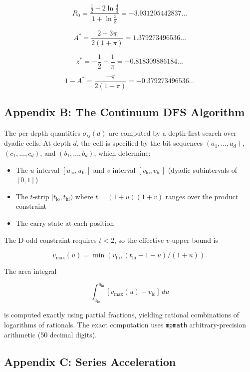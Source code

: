 \documentclass[
  11pt,
]{article}
\providecommand{\tightlist}{%
  \setlength{\itemsep}{0pt}\setlength{\parskip}{0pt}}
\begin{document}
\[R_0 = \frac{\tfrac{1}{2} - 2\ln\tfrac{4}{3}}{1 + \ln\tfrac{3}{8}} = -3.931205442837\ldots\]

\[A^{\ast} = \frac{2 + 3\pi}{2(1+\pi)} = 1.379273496536\ldots\]

\[z^{\ast} = -\frac{1}{2} - \frac{1}{\pi} = -0.818309886184\ldots\]

\[1 - A^{\ast} = \frac{-\pi}{2(1+\pi)} = -0.379273496536\ldots\]

\newpage

\subsection{Appendix B: The Continuum DFS
Algorithm}\label{appendix-b-the-continuum-dfs-algorithm}

The per-depth quantities \(\sigma_{ij}(d)\) are computed by a depth-first search
over dyadic cells. At depth \(d\), the cell is specified by the bit sequences
\((a_1, \ldots, a_d)\), \((c_1, \ldots, c_d)\), and \((b_1, \ldots, b_d)\),
which determine:

\begin{itemize}
\tightlist
\item
  The \(u\)-interval \([u_{\mathrm{lo}}, u_{\mathrm{hi}}]\) and \(v\)-interval
  \([v_{\mathrm{lo}}, v_{\mathrm{hi}}]\) (dyadic subintervals of \([0,1]\))
\item
  The \(t\)-strip \([t_{\mathrm{lo}}, t_{\mathrm{hi}})\) where
  \(t = (1+u)(1+v)\) ranges over the product constraint
\item
  The carry state at each position
\end{itemize}

The D-odd constraint requires \(t < 2\), so the effective \(v\)-upper bound is

\[v_{\max}(u) = \min(v_{\mathrm{hi}}, (t_{\mathrm{hi}} - 1 - u)/(1 + u)).\]

The area integral

\[\int_{u_{\mathrm{lo}}}^{u_{\mathrm{hi}}} [v_{\max}(u) - v_{\mathrm{lo}}] \, du\]

is computed exactly using partial fractions, yielding rational combinations of
logarithms of rationals. The exact computation uses \texttt{mpmath}
arbitrary-precision arithmetic (50 decimal digits).

\newpage

\subsection{Appendix C: Series
Acceleration}\label{appendix-c-series-acceleration}
\end{document}
